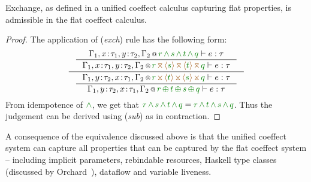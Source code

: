 \begin{lemma}
\label{thm:further-rev-exch}
Exchange, as defined in a unified coeffect calculus capturing flat properties, is admissible in
the flat coeffect calculus.
\end{lemma}
\begin{proof}
The application of (\emph{exch}) rule has the following form:
\begin{equation*}
\inference
 {\inference
    {\coctx{\Gamma_1,x\!:\!\tau_1,y\!:\!\tau_2,\Gamma_2}{\cclrd{r} \,\czip\, \cclrd{s} \,\czip\, \cclrd{t} \,\czip\, \cclrd{q}} \vdash e : \tau}
    {\coctx{\Gamma_1,x\!:\!\tau_1,y\!:\!\tau_2,\Gamma_2}{\cclrd{r} \,\azip\, \alift{\cclrd{s}} \,\azip\, \alift{\cclrd{t}} \,\azip\, \cclrd{q}} \vdash e : \tau} }
 {\inference
    {\coctx{\Gamma_1,y\!:\!\tau_2,x\!:\!\tau_1,\Gamma_2}{\cclrd{r} \,\apar\, \alift{\cclrd{t}} \,\apar\, \alift{\cclrd{s}} \,\apar\, \cclrd{q}} \vdash e : \tau}
    {\coctx{\Gamma_1,y\!:\!\tau_2,x\!:\!\tau_1,\Gamma_2}{\cclrd{r} \,\cpar\, \cclrd{t} \,\cpar\, \cclrd{s} \,\cpar\, \cclrd{q}} \vdash e : \tau} }
\end{equation*}
%
From idempotence of $\czip$, we get that $\cclrd{r} \,\czip\, \cclrd{s} \,\czip\, \cclrd{t} \,\czip\, \cclrd{q} =
\cclrd{r} \,\czip\, \cclrd{t} \,\czip\, \cclrd{s} \,\czip\, \cclrd{q}$. Thus the judgement can be derived using
(\emph{sub}) as in contraction.
\end{proof}

\noindent
A consequence of the equivalence discussed above is that the unified coeffect system can capture
all properties that can be captured by the flat coeffect system -- including implicit parameters,
rebindable resources, Haskell type classes (discussed by Orchard~\cite{comonads-dom-thesis}),
dataflow and variable liveness.



%

